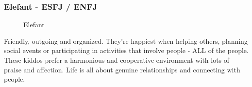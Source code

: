\subsubsection{Elefant - ESFJ / ENFJ}
\begin{figure}[htbp!]
	\centering
	\caption[Elefant]{Elefant \cite{knowAndLove}}
	\label{img:Elefant}
\end{figure}
Friendly, outgoing and organized. They're happiest when helping others, planning social events or participating in activities that involve people - ALL of the people. These kiddos prefer a harmonious and cooperative environment with lots of praise and affection. Life is all about genuine relationships and connecting with people.	\\
